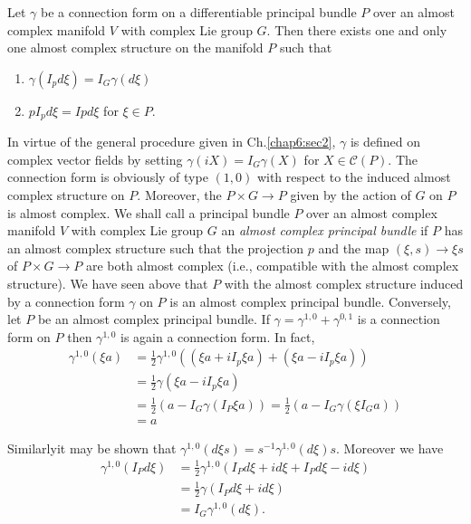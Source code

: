 \setcounter{proposition}{0}
\begin{proposition}\label{chap6:sec4:prop1}%
  Let $\gamma$ be a connection form on a differentiable principal
  bundle $P$ over an almost complex manifold $V$ with complex Lie
  group $G$. Then there exists one and only one almost complex
  structure on the manifold $P$ such that  
  \begin{enumerate}[1)]
  \item $\gamma (I_p d \xi ) = I_G \gamma (d \xi)$
  \item $pI_p d \xi = I pd \xi $   for   $\xi \in P$.
  \end{enumerate}

  In virtue of the general procedure given in Ch.\ref{chap6:sec2}, $\gamma$ is
  defined on complex vector fields by setting $\gamma (iX) = I_G
  \gamma (X)$ for $X \in \mathscr{C}(P)$. The connection form is
  obviously of type $(1, 0)$ with respect to the induced almost
  complex structure on $P$. Moreover, the $P \times G \to P$ given by
  the action of $G$ on $P$ is almost complex. We shall call a
  principal bundle $P$ over an almost complex manifold $V$ with
  complex Lie group $G$ an \textit{almost complex principal bundle} if
  $P$ has an almost complex structure such that the projection $p$ and
  the map $(\xi, s) \to \xi s$ of $P \times G \to P$ are both almost
  complex (i.e., compatible with the almost complex structure). We have
  seen above that $P$ with the almost complex structure induced by a
  connection form $\gamma$ on $P$ is an almost complex principal
  bundle. Conversely, let $P$ be an almost complex principal
  bundle. If $\gamma = \gamma^{1, 0} + \gamma^{0 , 1}$ is a connection
  form on $P$ then $\gamma^{1, 0}$ is again a connection form. In
  fact, 
\begin{align*}
  \gamma^{1, 0} (\xi a) & = \frac{1}{2} \gamma^{1, 0} ((\xi a + iI_p
  \xi a) + (\xi a - iI_p \xi a) )\\ 
  & = \frac{1}{2} \gamma (\xi a - iI_p \xi a)\\
  & = \frac{1}{2} (a - I_G \gamma (I_P \xi a)) = \frac{1}{2} (a - I_G
  \gamma (\xi I_G a))\\ 
  & = a
\end{align*}
\end{proposition}

Similarly\pageoriginale it may be shown that $\gamma^{1, 0} (d \xi s) = s^{-1}
\gamma^{1, 0} (d \xi)s$. Moreover we have 
\begin{align*}
  \gamma^{1, 0} (I_P d \xi) & = \frac{1}{2} \gamma^{1, 0} (I_P d \xi +
  id \xi + I_P d\xi - id \xi)\\ 
  & = \frac{1}{2} \gamma (I_P d \xi + id \xi)\\
  & = I_G \gamma^{1, 0} (d \xi).
\end{align*}

